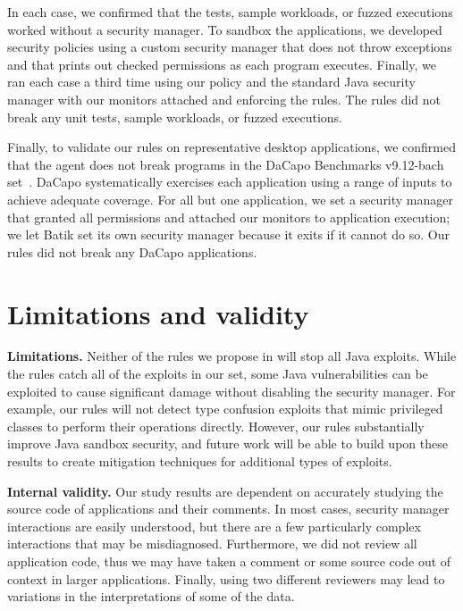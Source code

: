 \documentclass{sig-alternate-05-2015}
\newcommand{\minisec}[1]{\noindent\textbf{#1}}
\begin{document}
In each case, we confirmed that the tests, sample workloads, or fuzzed executions
worked without a security manager. To sandbox the applications,
we developed security policies using a custom security manager that does not throw exceptions 
and that prints out checked permissions as each program executes. Finally, we
ran each case a third time 
using our policy and the standard Java security manager with our monitors
attached and enforcing the rules. The rules did not break any unit tests, sample
workloads, or fuzzed executions.

Finally, to validate our rules on representative desktop applications, we confirmed that the
agent does not break programs in the DaCapo Benchmarks v9.12-bach set~\cite{dacapo}. 
DaCapo systematically exercises each application using a range of inputs to achieve
adequate coverage. For all but one
application, we set a security manager that granted all
permissions and attached our monitors to application execution; we let Batik set
its own security manager because it exits if it cannot do so. 
Our rules did not break any DaCapo applications.

\section{Limitations and validity}\label{sec:Limitations}

\minisec{Limitations.}
Neither of the rules we propose in  will stop all Java exploits. While the rules
catch all of the exploits in our set, some Java vulnerabilities can
be exploited to cause significant damage without disabling the security
manager. For example, our rules will not detect type confusion exploits
that mimic privileged classes to perform their operations directly.
However, our rules substantially improve Java sandbox security, and
future work will be able to build upon these results to create mitigation
techniques for additional types of exploits.

\minisec{Internal validity.} 
Our study results are dependent on accurately studying the source code of
applications and their comments. In most cases, security manager interactions
are easily understood, but there are a few particularly complex interactions
that may be misdiagnosed. Furthermore, we did not review all application
code, thus we may have taken a comment or some source code out of
context in larger applications. Finally, using two different reviewers
may lead to variations in the interpretations of some of the data. 
\end{document}
